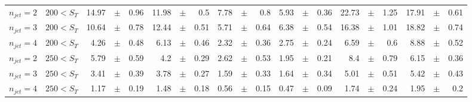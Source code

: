 \documentclass[12pt]{paper}
\begin{document}
\begin{sidewaystable}[ht]
\begin{center}
\begin{tabular}{cc|rrr|rrr|rrr|rrr|rrr|rrr}
$n_{jet}=2$ & $200< S_{T}$ & 14.97&$\pm$&0.96 & 11.98&$\pm$&0.5 & 7.78&$\pm$&0.8 & 5.93&$\pm$&0.36 & 22.73&$\pm$&1.25 & 17.91&$\pm$&0.61\\
$n_{jet}=3$ & $200< S_{T}$ & 10.64&$\pm$&0.78 & 12.44&$\pm$&0.51 & 5.71&$\pm$&0.64 & 6.38&$\pm$&0.54 & 16.38&$\pm$&1.01 & 18.82&$\pm$&0.74\\
$n_{jet}=4$ & $200< S_{T}$ & 4.26&$\pm$&0.48 & 6.13&$\pm$&0.46 & 2.32&$\pm$&0.36 & 2.75&$\pm$&0.24 & 6.59&$\pm$&0.6 & 8.88&$\pm$&0.52\\
$n_{jet}=2$ & $250< S_{T}$ & 5.79&$\pm$&0.59 & 4.2&$\pm$&0.29 & 2.62&$\pm$&0.53 & 1.95&$\pm$&0.21 & 8.4&$\pm$&0.79 & 6.15&$\pm$&0.36\\
$n_{jet}=3$ & $250< S_{T}$ & 3.41&$\pm$&0.39 & 3.78&$\pm$&0.27 & 1.59&$\pm$&0.33 & 1.64&$\pm$&0.34 & 5.01&$\pm$&0.51 & 5.42&$\pm$&0.43\\
$n_{jet}=4$ & $250< S_{T}$ & 1.17&$\pm$&0.19 & 1.48&$\pm$&0.18 & 0.56&$\pm$&0.15 & 0.47&$\pm$&0.09 & 1.74&$\pm$&0.24 & 1.95&$\pm$&0.2\\
\end{tabular}
\end{center}
\end{sidewaystable}
\end{document}
